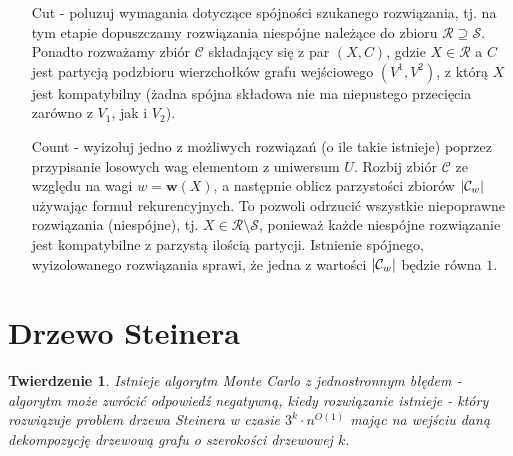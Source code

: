 \documentclass[12pt, oneside]{report}
\newtheorem{theorem}{Twierdzenie}
\newcommand\Omicron{O}
\begin{document}
\begin{enumerate}

\item[Cut] - poluzuj wymagania dotyczące spójności szukanego rozwiązania, tj. na tym etapie dopuszczamy rozwiązania niespójne należące do zbioru $\mathcal{R} \supseteq \mathcal{S}$. Ponadto rozważamy zbiór $\mathcal{C}$ składający się z par $(X, C)$, gdzie $X \in \mathcal{R}$ a $C$ jest partycją podzbioru wierzchołków grafu wejściowego $(V^1, V^2)$, z którą $X$ jest kompatybilny (żadna spójna składowa nie ma niepustego przecięcia zarówno z $V_1$, jak i $V_2$).  

\item[Count] - wyizoluj jedno z możliwych rozwiązań (o ile takie istnieje) poprzez przypisanie losowych wag elementom z uniwersum $U$. Rozbij zbiór $\mathcal{C}$ ze względu na wagi $w = \mathbf{w}(X)$, a następnie oblicz parzystości zbiorów $\abs{\mathcal{C}_w}$ używając formuł rekurencyjnych. To pozwoli odrzucić wszystkie niepoprawne rozwiązania (niespójne), tj. $X \in \mathcal{R} \setminus \mathcal{S}$, ponieważ każde niespójne rozwiązanie jest kompatybilne z parzystą ilością partycji. Istnienie spójnego, wyizolowanego rozwiązania sprawi, że jedna z wartości $\abs{\mathcal{C}_w}$ będzie równa $1$.

\end{enumerate}

    	\section{Drzewo Steinera}


\begin{theorem}
\label{monte_carlo}
\em Istnieje algorytm Monte Carlo z jednostronnym błędem - algorytm może zwrócić odpowiedź negatywną, kiedy rozwiązanie istnieje - który rozwiązuje problem drzewa Steinera w czasie $3^k \cdot n^{\Omicron(1)}$ mając na wejściu daną dekompozycję drzewową grafu o szerokości drzewowej $k$.
\end{theorem}
\end{document}
